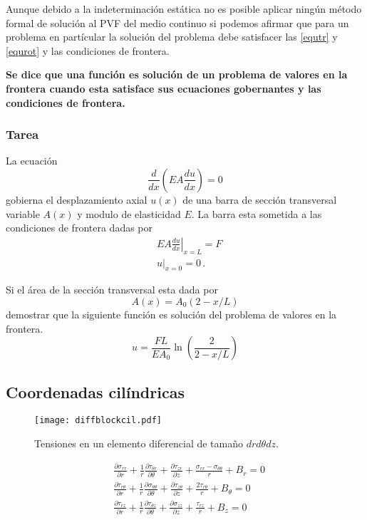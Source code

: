 \documentclass[../notas medios.tex]{subfiles}
\begin{document}
Aunque debido a la indeterminación estática no es posible aplicar ningún método formal de solución al PVF del medio continuo si podemos afirmar que para un problema en partícular la solución del problema debe satisfacer las \cref{equtr} y \cref{equrot} y las condiciones de frontera.

\textbf{Se dice que una función es solución de un problema de valores en la frontera cuando esta satisface sus ecuaciones gobernantes y las condiciones de frontera.}  


\subsubsection{Tarea}

La ecuación
\[\frac{d}{{dx}}\left( {EA\frac{{du}}{{dx}}} \right) = 0\]
gobierna el desplazamiento axial $u(x)$ de una barra de sección transversal variable $A(x)$ y modulo de elasticidad $E$. La barra esta sometida a las condiciones de frontera dadas por
\begin{align*}
&\left. {EA\frac{du}{dx}} \right|_{x = L} = F\\
&\left. u \right|_{x = 0} = 0\, .
\end{align*}

Si el área de la sección transversal esta dada por
\[A(x) = {A_0}(2 - x/L)\]
demostrar que la siguiente función es solución del problema de valores en la frontera.
\[u = \frac{FL}{E A_0}\ln \left(\frac{2}{2 - x/L}\right)\]

\subsection{Coordenadas cilíndricas}


\begin{figure}[H]
\centering
	\texttt{[image: diffblockcil.pdf]}
	\caption{Tensiones en un elemento diferencial de tamaño $dr{d\theta}dz$.}
	\label{diffcil}
\end{figure}

\begin{equation} \label{equcil}
\begin{split}
& \frac{{\partial {\sigma _{rr}}}}{{\partial r}} + \frac{1}{r}  \frac{{\partial {\tau _{{\theta}r}}}}{{\partial \theta}} + \frac{{\partial {\tau _{zr}}}}{{\partial z}} + \frac{\sigma _{rr} - \sigma _{{\theta}{\theta}}}{r} + {B_r} = 0 \\
& \frac{{\partial {\tau _{r{\theta}}}}}{{\partial r}} + \frac{1}{r} \frac{{\partial {\sigma _{{\theta}{\theta}}}}}{{\partial \theta}} + \frac{{\partial {\tau _{z{\theta}}}}}{{\partial z}} +  \frac{2 \tau_{r{\theta}}}{r} + {B_\theta} = 0 \\
& \frac{{\partial {\tau _{rz}}}}{{\partial r}} + \frac{1}{r} \frac{{\partial {\tau _{{\theta}z}}}}{{\partial \theta}} + \frac{{\partial {\sigma _{zz}}}}{{\partial z}} + \frac{ \tau_{rz}}{r} + {B_z} = 0 
\end{split}
\end{equation}
\end{document}
